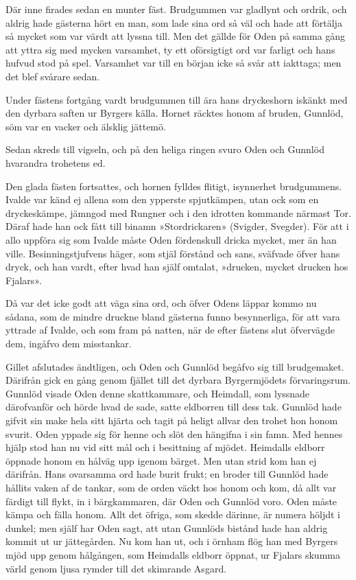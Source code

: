 Där inne firades sedan en munter fäst. Brudgummen var gladlynt och
ordrik, och aldrig hade gästerna hört en man, som lade sina ord så väl
och hade att förtälja så mycket som var värdt att lyssna till. Men det
gällde för Oden på samma gång att yttra sig med mycken varsamhet, ty ett
oförsigtigt ord var farligt och hans hufvud stod på spel. Varsamhet var
till en början icke så svår att iakttaga; men det blef svårare sedan.

Under fästens fortgång vardt brudgummen till ära hans dryckeshorn
iskänkt med den dyrbara saften ur Byrgers källa. Hornet räcktes honom af
bruden, Gunnlöd, söm var en vacker och älsklig jättemö.

Sedan skreds till vigseln, och på den heliga ringen svuro Oden och
Gunnlöd hvarandra trohetens ed.

Den glada fästen fortsattes, och hornen fylldes flitigt,
\protect\hypertarget{lb1625905.xhtmlux5cux23start71}{}{}\protect\hypertarget{lb1625905.xhtmlux5cux23start71-a}{}{}\protect\hypertarget{lb1625905.xhtmlux5cux23start71-b}{}{}\protect\hypertarget{lb1625905.xhtmlux5cux23start71-c}{}{}\protect\hypertarget{lb1625905.xhtmlux5cux23start71-d}{}{}
isynnerhet brudgummens. Ivalde var känd ej allena som den ypperste
spjutkämpen, utan ock som en dryckeskämpe, jämngod med Rungner och i den
idrotten kommande närmast Tor. Däraf hade han ock fått till binamn
»Stordrickaren» (Svigder, Svegder). För att i allo uppföra sig som
Ivalde måste Oden fördenskull dricka mycket, mer än han ville.
Besinningstjufvens häger, som stjäl förstånd och sans, sväfvade öfver
hans dryck, och han vardt, efter hvad han själf omtalat, »drucken,
mycket drucken hos Fjalars».

Då var det icke godt att väga sina ord, och öfver Odens läppar kommo nu
sådana, som de mindre druckne bland gästerna funno besynnerliga, för att
vara yttrade af Ivalde, och som fram på natten, när de efter fästens
slut öfvervägde dem, ingåfvo dem misstankar.

Gillet afslutades ändtligen, och Oden och Gunnlöd begåfvo sig till
brudgemaket. Därifrån gick en gång genom fjället till det dyrbara
Byrgermjödets förvaringsrum. Gunnlöd visade Oden denne skattkammare, och
Heimdall, som lyssnade därofvanför och hörde hvad de sade, satte
eldborren till dess tak. Gunnlöd hade gifvit sin make hela sitt hjärta
och tagit på heligt allvar den trohet hon honom svurit. Oden yppade sig
för henne och slöt den hängifna i sin famn. Med hennes hjälp stod han nu
vid sitt mål och i besittning af mjödet. Heimdalls eldborr öppnade honom
en hålväg upp igenom bärget. Men utan strid kom han ej därifrån. Hans
ovarsamma ord hade burit frukt; en broder till Gunnlöd hade hållits
vaken af de tankar, som de orden väckt hos honom och kom, då allt var
färdigt till flykt, in i bärgkammaren, där Oden och Gunnlöd voro. Oden
måste kämpa och fälla honom. Allt det öfriga, som skedde därinne, är
numera höljdt i dunkel; men själf har Oden sagt, att utan Gunnlöds
bistånd hade han aldrig kommit ut ur jättegården. Nu kom han ut, och i
örnham flög han med Byrgers mjöd upp genom hålgången, som Heimdalls
eldborr öppnat, ur Fjalars skumma värld genom ljusa rymder till det
skimrande Asgard.


